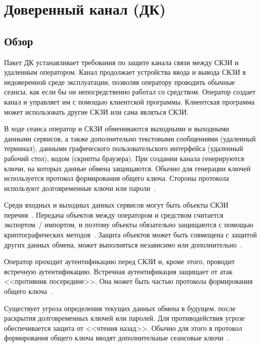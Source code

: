 \section{Доверенный канал (ДК)}\label{TC}

\subsection{Обзор}\label{TC.Intro}

Пакет ДК устанавливает требования по защите канала связи между СКЗИ и удаленным 
оператором. 
%
Канал продолжает устройства ввода и вывода СКЗИ в недоверенной среде 
эксплуатации, позволяя оператору проводить обычные сеансы,
как если бы он непосредственно работал со средством.
%
Оператор создает канал и управляет им с помощью клиентской программы. 
Клиентская программа может использовать другие СКЗИ или сама являться СКЗИ.  

В ходе сеанса оператор и СКЗИ обмениваются выходными и выходными 
данными сервисов, а также дополнительно 
текстовыми сообщениями (удаленный терминал), 
данными графического пользовательского интерфейса (удаленный рабочий стол),
кодом (скрипты браузера).
%
При создании канала генерируются ключи, на которых данные обмена защищаются. 
Обычно для генерации ключей используется протокол формирования общего 
ключа. Стороны протокола используют долговременные ключи или 
пароли~.

Среди входных и выходных данных сервисов могут быть объекты СКЗИ 
перечня~. Передача объектов между оператором и средством 
считается экспортом~/ импортом, и поэтому объекты обязательно защищаются с помощью 
криптографических методов~. Защита объектов 
может быть совмещена с защитой других данных обмена, может выполняться 
независимо или дополнительно~.

Оператор проходит аутентификацию перед СКЗИ и, кроме этого, проводит встречную 
аутентификацию. Встречная аутентификация защищает от атак <<противник 
посередине>>. Она может быть частью протокола формирования общего 
ключа~.

Существует угроза определения текущих данных обмена в будущем, после раскрытия 
долговременных ключей или паролей. Для противодействия угрозе обеспечивается 
защита от <<чтения назад>>. Обычно для этого в протокол формирования общего ключа
вводят дополнительные сеансовые ключи~. 

